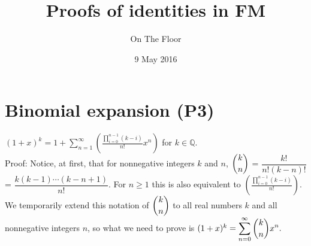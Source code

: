\documentclass[11pt,a4paper]{article}
\begin{document}
\title{Proofs of identities in FM}
\author{On The Floor}
\date{9 May 2016}
\maketitle

\section {Binomial expansion (P3)}

$(1+x)^k=1+\displaystyle\sum_{n=1}^{\infty} \left(\frac{\displaystyle\prod_{i=0}^{n-1} (k-i)}{n!}x^n\right)$ for $k\in\mathbb{Q}$.\\
Proof: Notice, at first, that for nonnegative integers $k$ and $n$, $\dbinom {k}{n}$ = $\dfrac{k!}{n!(k-n)!}$ = $\dfrac{k(k-1)\cdots (k-n+1)}{n!}$. For $n\ge 1$ this is also equivalent to $\left(\frac{\displaystyle\prod_{i=0}^{n-1} (k-i)}{n!}\right)$. We temporarily extend this notation of $\dbinom{k}{n}$ to all real numbers $k$ and all nonnegative integers $n$, so what we need to prove is $(1+x)^k=\displaystyle\sum_{n=0}^{\infty} \dbinom {k}{n}x^n.$
\end{document}
